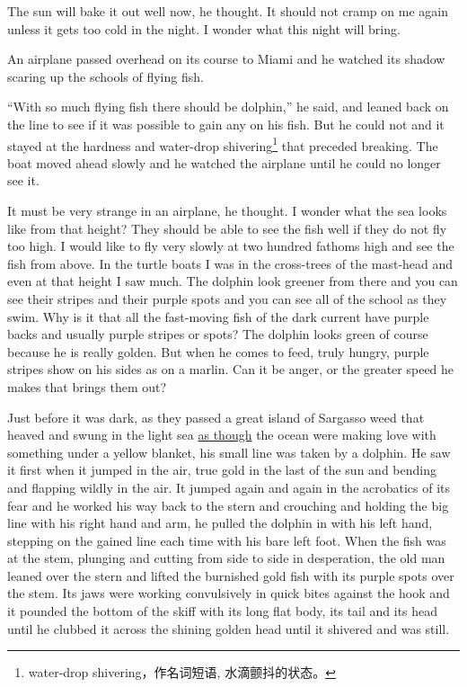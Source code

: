 \documentclass[fontset=ubuntu]{ctexrep}
\newlength{\drop}%
\begin{document}
The sun will \gls{bake} it out well now, he thought. It
should not cramp on me again unless it gets too cold in the night. I wonder
what this night will bring.

An airplane passed overhead on its course to Miami and he watched its shadow
scaring up the schools of flying fish.

``With so much flying fish there should be dolphin,'' he said, and leaned
back on the line to see if it was possible to gain any on his fish. But he
could not and it stayed at the \gls{hardness} and water-drop
shivering\footnote{water-drop shivering，作名词短语, 水滴颤抖的状态。} that
\gls{preceded} breaking. The boat moved ahead slowly and he watched the
airplane until he could no longer see it.

It must be very strange in an airplane, he thought. I wonder what the sea
looks like from that height? They should be able to see the fish well if
they do not fly too high. I would like to fly very slowly at two hundred
fathoms high and see the fish from above. In the turtle boats I was in the
cross-trees of the mast-head and even at that height I saw much. The dolphin
look greener from there and you can see their stripes and their purple \glspl{spot}
and you can see all of the school as they swim. Why is it that all the
fast-moving fish of the dark current have purple backs and usually purple
stripes or spots? The dolphin looks green of course because he is really
golden. But when he comes to feed, truly hungry, purple stripes show on his
sides as on a marlin. Can it be \gls{anger}, or the greater speed he makes
that brings them out?

Just before it was dark, as they passed a great island of Sargasso weed that
\gls{heaved} and swung in the light sea \uline{as though} the ocean were making love
with something under a yellow blanket, his small line was taken by a
dolphin. He saw it first when it jumped in the air, true gold in the last of
the sun and \gls{bending} and \gls{flapping} wildly in the air. It jumped
again and again in the \gls{acrobatics} of its \gls{fear} and he worked his
way back to the stern and \gls{crouching} and holding the big line with his
right hand and arm, he pulled the dolphin in with his left hand, stepping on
the gained line each time with his bare left foot. When the fish was at the
\gls{stem}, \gls{plunging} and cutting from side to side in
\gls{desperation}, the old man leaned over the stern and lifted the
\gls{burnished} gold fish with its purple spots over the stem. Its
\glspl{jaw} were working \gls{convulsively} in quick bites against the hook
and it pounded the bottom of the skiff with its long flat body, its tail and
its head until he \gls{clubbed} it across the shining golden head until it
shivered and was still.
\end{document}
